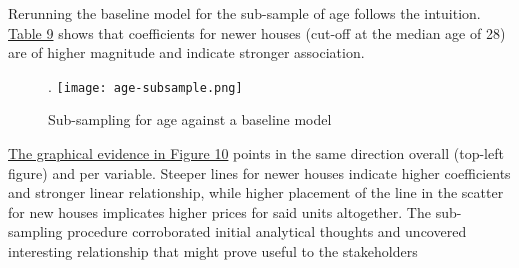 \documentclass{article}
\begin{document}
Rerunning the baseline model for the sub-sample of age follows the intuition. \hyperref[tab:age]{Table 9} shows that coefficients for newer houses (cut-off at the median age of 28) are of higher magnitude and indicate stronger association.

\begin{figure}[h]
    \caption{Sub-sampling for age against a baseline model}.
    \centering
    \texttt{[image: age-subsample.png]}
    \label{fig:agesubsample}
\end{figure}

\hyperref[fig:agesubsample]{The graphical evidence in Figure 10} points in the same direction overall (top-left figure) and per variable. Steeper lines for newer houses indicate higher coefficients and stronger linear relationship, while higher placement of the line in the scatter for new houses implicates higher prices for said units altogether. The sub-sampling procedure corroborated initial analytical thoughts and uncovered interesting relationship that might prove useful to the stakeholders 


\appendix
\end{document}
